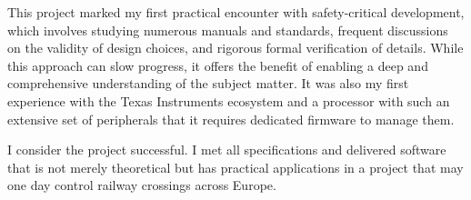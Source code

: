 This project marked my first practical encounter with safety-critical development, which involves studying numerous manuals and standards, frequent discussions on the validity of design choices, and rigorous formal verification of details. While this approach can slow progress, it offers the benefit of enabling a deep and comprehensive understanding of the subject matter. It was also my first experience with the Texas Instruments ecosystem and a processor with such an extensive set of peripherals that it requires dedicated firmware to manage them.

I consider the project successful. I met all specifications and delivered software that is not merely theoretical but has practical applications in a project that may one day control railway crossings across Europe.